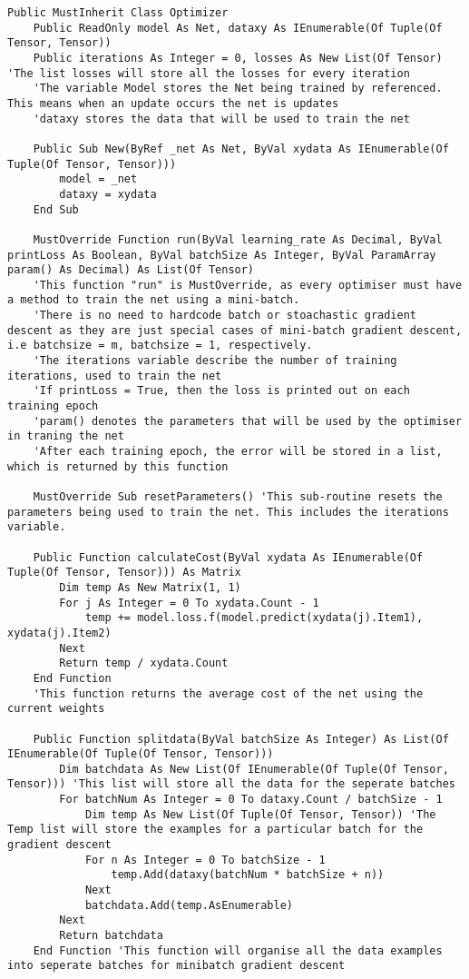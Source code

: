 \begin{verbatim}
Public MustInherit Class Optimizer
    Public ReadOnly model As Net, dataxy As IEnumerable(Of Tuple(Of Tensor, Tensor))
    Public iterations As Integer = 0, losses As New List(Of Tensor) 'The list losses will store all the losses for every iteration
    'The variable Model stores the Net being trained by referenced. This means when an update occurs the net is updates
    'dataxy stores the data that will be used to train the net

    Public Sub New(ByRef _net As Net, ByVal xydata As IEnumerable(Of Tuple(Of Tensor, Tensor)))
        model = _net
        dataxy = xydata
    End Sub

    MustOverride Function run(ByVal learning_rate As Decimal, ByVal printLoss As Boolean, ByVal batchSize As Integer, ByVal ParamArray param() As Decimal) As List(Of Tensor)
    'This function "run" is MustOverride, as every optimiser must have a method to train the net using a mini-batch.
    'There is no need to hardcode batch or stoachastic gradient descent as they are just special cases of mini-batch gradient descent, i.e batchsize = m, batchsize = 1, respectively.
    'The iterations variable describe the number of training iterations, used to train the net
    'If printLoss = True, then the loss is printed out on each training epoch
    'param() denotes the parameters that will be used by the optimiser in traning the net
    'After each training epoch, the error will be stored in a list, which is returned by this function

    MustOverride Sub resetParameters() 'This sub-routine resets the parameters being used to train the net. This includes the iterations variable.

    Public Function calculateCost(ByVal xydata As IEnumerable(Of Tuple(Of Tensor, Tensor))) As Matrix
        Dim temp As New Matrix(1, 1)
        For j As Integer = 0 To xydata.Count - 1
            temp += model.loss.f(model.predict(xydata(j).Item1), xydata(j).Item2)
        Next
        Return temp / xydata.Count
    End Function
    'This function returns the average cost of the net using the current weights

    Public Function splitdata(ByVal batchSize As Integer) As List(Of IEnumerable(Of Tuple(Of Tensor, Tensor)))
        Dim batchdata As New List(Of IEnumerable(Of Tuple(Of Tensor, Tensor))) 'This list will store all the data for the seperate batches
        For batchNum As Integer = 0 To dataxy.Count / batchSize - 1
            Dim temp As New List(Of Tuple(Of Tensor, Tensor)) 'The Temp list will store the examples for a particular batch for the gradient descent
            For n As Integer = 0 To batchSize - 1
                temp.Add(dataxy(batchNum * batchSize + n))
            Next
            batchdata.Add(temp.AsEnumerable)
        Next
        Return batchdata
    End Function 'This function will organise all the data examples into seperate batches for minibatch gradient descent



\end{verbatim}
